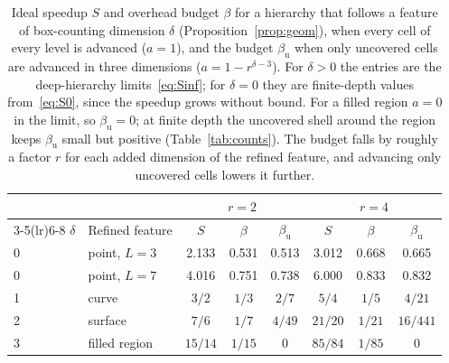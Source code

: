\documentclass[12pt]{article}
\theoremstyle{remark}
\begin{document}
\begin{table}[ht]
\centering
\caption{Ideal speedup $S$ and overhead budget $\beta$ for a hierarchy that follows a feature of box-counting dimension $\delta$ (Proposition~\ref{prop:geom}), when every cell of every level is advanced ($a=1$), and the budget $\beta_{\mathrm{u}}$ when only uncovered cells are advanced in three dimensions ($a=1-r^{\delta-3}$). For $\delta>0$ the entries are the deep-hierarchy limits~\eqref{eq:Sinf}; for $\delta=0$ they are finite-depth values from~\eqref{eq:S0}, since the speedup grows without bound. For a filled region $a=0$ in the limit, so $\beta_{\mathrm{u}}=0$; at finite depth the uncovered shell around the region keeps $\beta_{\mathrm{u}}$ small but positive (Table~\ref{tab:counts}). The budget falls by roughly a factor $r$ for each added dimension of the refined feature, and advancing only uncovered cells lowers it further.}
\label{tab:limits}
\begin{tabular}{llcccccc}
\toprule
 & & \multicolumn{3}{c}{$r=2$} & \multicolumn{3}{c}{$r=4$}\\
\cmidrule(lr){3-5}\cmidrule(lr){6-8}
$\delta$ & Refined feature & $S$ & $\beta$ & $\beta_{\mathrm{u}}$ & $S$ & $\beta$ & $\beta_{\mathrm{u}}$\\
\midrule
0 & point, $L=3$ & 2.133 & 0.531 & 0.513 & 3.012 & 0.668 & 0.665\\
0 & point, $L=7$ & 4.016 & 0.751 & 0.738 & 6.000 & 0.833 & 0.832\\
1 & curve & $3/2$ & $1/3$ & $2/7$ & $5/4$ & $1/5$ & $4/21$\\
2 & surface & $7/6$ & $1/7$ & $4/49$ & $21/20$ & $1/21$ & $16/441$\\
3 & filled region & $15/14$ & $1/15$ & $0$ & $85/84$ & $1/85$ & $0$\\
\bottomrule
\end{tabular}
\end{table}
\end{document}
